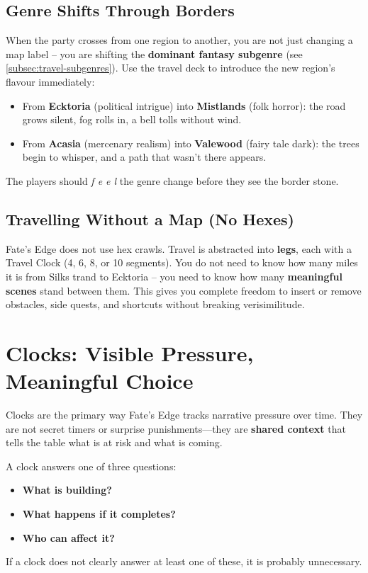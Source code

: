 \subsection{Genre Shifts Through Borders}
When the party crosses from one region to another, you are not just changing a map label – you are shifting the \textbf{dominant fantasy subgenre} (see \ref{subsec:travel-subgenres}). Use the travel deck to introduce the new region’s flavour immediately:
\begin{itemize}
  \item From \textbf{Ecktoria} (political intrigue) into \textbf{Mistlands} (folk horror): the road grows silent, fog rolls in, a bell tolls without wind.
  \item From \textbf{Acasia} (mercenary realism) into \textbf{Valewood} (fairy tale dark): the trees begin to whisper, and a path that wasn’t there appears.
\end{itemize}
The players should \emph{f e e l} the genre change before they see the border stone.

\subsection{Travelling Without a Map (No Hexes)}
Fate’s Edge does not use hex crawls. Travel is abstracted into \textbf{legs}, each with a Travel Clock (4, 6, 8, or 10 segments). You do not need to know how many miles it is from Silks trand to Ecktoria – you need to know how many \textbf{meaningful scenes} stand between them.  
This gives you complete freedom to insert or remove obstacles, side quests, and shortcuts without breaking verisimilitude.

\section{Clocks: Visible Pressure, Meaningful Choice}
\label{sec:clocks}

Clocks are the primary way Fate’s Edge tracks narrative pressure over time.  
They are not secret timers or surprise punishments—they are \textbf{shared context} that tells the table what is at risk and what is coming.

A clock answers one of three questions:
\begin{itemize}
  \item \textbf{What is building?}
  \item \textbf{What happens if it completes?}
  \item \textbf{Who can affect it?}
\end{itemize}
If a clock does not clearly answer at least one of these, it is probably unnecessary.

